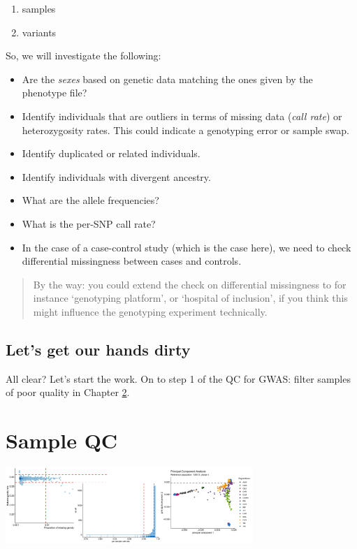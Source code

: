 \documentclass[
]{book}
\providecommand{\tightlist}{%
  \setlength{\itemsep}{0pt}\setlength{\parskip}{0pt}}
\begin{document}
\begin{enumerate}
\def\labelenumi{\arabic{enumi})}
\tightlist
\item
  samples
\item
  variants
\end{enumerate}

So, we will investigate the following:

\begin{itemize}
\tightlist
\item
  Are the \emph{sexes} based on genetic data matching the ones given by the phenotype file?
\item
  Identify individuals that are outliers in terms of missing data (\emph{call rate}) or heterozygosity rates. This could indicate a genotyping error or sample swap.
\item
  Identify duplicated or related individuals.
\item
  Identify individuals with divergent ancestry.
\item
  What are the allele frequencies?
\item
  What is the per-SNP call rate?
\item
  In the case of a case-control study (which is the case here), we need to check differential missingness between cases and controls.
\end{itemize}

\begin{quote}
By the way: you could extend the check on differential missingness to for instance `genotyping platform', or `hospital of inclusion', if you think this might influence the genotyping experiment technically.
\end{quote}

\hypertarget{lets-get-our-hands-dirty}{%
\section{Let's get our hands dirty}\label{lets-get-our-hands-dirty}}

All clear? Let's start the work. On to step 1 of the QC for GWAS: filter samples of poor quality in Chapter \ref{gwas-basics-sample-qc}.

\hypertarget{gwas-basics-sample-qc}{%
\chapter{Sample QC}\label{gwas-basics-sample-qc}}

\includegraphics[width=0.7\textwidth,height=\textheight]{./img/_gwas_dummy/gwas_sample_qc.png}
\end{document}

